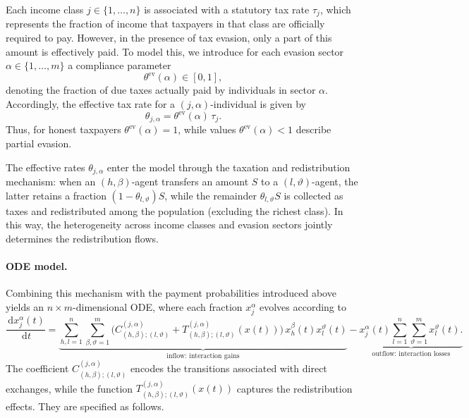 \documentclass[11pt]{article}
\theoremstyle{plain}
\theoremstyle{definition}
\newcommand{\1}{\mathbf{1}}
\newcommand{\dd}{\,\mathrm{d}}
\begin{document}
Each income class $j \in \{ 1,\ldots,n \}$ is associated with a statutory tax rate $\tau_j$, which represents the fraction of income that taxpayers in that class are officially required to pay. However, in the presence of tax evasion, only a part of this amount
is effectively paid. To model this, we introduce for each evasion sector $\alpha \in \{1,\dots,m\}$ a compliance parameter
\begin{equation*}
 \theta^{\mathrm{ev}}(\alpha) \in [0,1],   
\end{equation*}
denoting the fraction of due taxes actually paid by individuals in sector $\alpha$.
Accordingly, the effective tax rate for a $(j,\alpha)$-individual is given by
\begin{equation}
    \theta_{j,\alpha} = \theta^{\mathrm{ev}}(\alpha)\,\tau_j .
    \label{frac-pay}
\end{equation}
Thus, for honest taxpayers $\theta^{\mathrm{ev}}(\alpha)=1$, while values $\theta^{\mathrm{ev}}(\alpha)<1$ describe partial evasion.

The effective rates $\theta_{j,\alpha}$ enter the model through the taxation and redistribution mechanism: when an $(h,\beta)$-agent transfers an amount $S$ to a $(l,\vartheta)$-agent, the latter retains a fraction \mbox{$(1-\theta_{l,\vartheta})S$}, while the remainder $\theta_{l,\vartheta} S$ is collected as taxes and redistributed among the population (excluding the richest class). In this way, the heterogeneity across income classes and evasion sectors jointly determines the redistribution flows.

\paragraph{ODE model.}


Combining this mechanism with the payment probabilities introduced above yields an $n\times m$-dimensional ODE, where each fraction $x_j^\alpha$ evolves according to
\begin{equation}\label{population_eq}
\frac{\dd x_j^\alpha(t)}{\dd t}
= \underbrace{\sum_{h,l=1}^n \sum_{\beta,\vartheta=1}^m
\Big(
   C^{(j,\alpha)}_{(h,\beta);(l,\vartheta)}
   + T^{(j,\alpha)}_{(h,\beta);(l,\vartheta)}(x(t))
\Big) \, x_h^\beta(t) x_l^\vartheta(t)}_{\text{inflow: interaction gains}}
- \underbrace{x_j^\alpha(t) \sum_{l=1}^n \sum_{\vartheta=1}^m x_l^\vartheta(t).}_{\text{outflow: interaction losses}}
\end{equation}
The coefficient $C^{(j,\alpha)}_{(h,\beta);(l,\vartheta)}$ encodes the transitions associated with direct exchanges, while the function  $T^{(j,\alpha)}_{(h,\beta);(l,\vartheta)}(x(t))$ captures the redistribution effects. They are specified as follows. 
\end{document}
